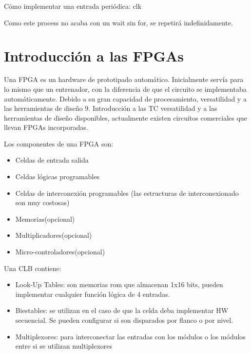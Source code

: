 Cómo implementar una entrada periódica: clk
\begin{figure}[H]
	\centering
	
\end{figure}

Como este process no acaba con un wait sin for, se repetirá indefinidamente.


\section{Introducción a las FPGAs}
Una FPGA es un hardware de prototipado automático. Inicialmente servía para lo mismo que un entrenador, con la diferencia de que el circuito se implementaba automáticamente. Debido a su gran capacidad de procesamiento, versatilidad y a las herramientas de diseño 9. Introducción a las TC versatilidad y a las herramientas de diseño disponibles, actualmente existen circuitos comerciales que llevan FPGAs incorporadas.

Los componentes de una FPGA son:
\begin{itemize}
	\item Celdas de entrada salida
	\item Celdas lógicas programables
	\item Celdas de interconexión programables (las estructuras de interconexionado son muy costosas)
	\item Memorias(opcional)
	\item Multiplicadores(opcional)
	\item Micro-controladores(opcional)
\end{itemize}

Una CLB contiene:
\begin{itemize}
	\item Look-Up Tables: son memorias \gls{rom} que almacenan 1x16 bits, pueden implementar cualquier función lógica de 4 entradas.
	\item Biestables: se utilizan en el caso de que la celda deba implementar HW secuencial. Se pueden configurar si son disparados por flanco o por nivel.
	\item Multiplexores: para interconectar las entradas con los módulos o los módulos entre si se utilizan multiplexores
\end{itemize}
